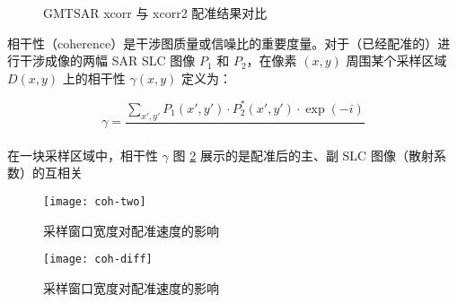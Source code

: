 \begin{figure}[htbp]
\centering
{}
\caption{GMTSAR xcorr 与 xcorr2 配准结果对比} \label{fig:exp_result}
\end{figure}

相干性（coherence）是干涉图质量或信噪比的重要度量。对于（已经配准的）进行干涉成像的两幅 SAR SLC 图像 $P_1$ 和 $P_2$，在像素 $(x, y)$ 周围某个采样区域 $D(x, y)$ 上的相干性 $\gamma(x, y)$ 定义为：

\begin{equation}
    \gamma = \frac{\sum_{x', y'} P_1(x', y') \cdot P_2^*(x', y') \cdot \exp(-i)}{}
\end{equation}


在一块采样区域中，相干性 $\gamma$
图 \ref{fig:coh-two} 展示的是配准后的主、副 SLC 图像（散射系数）的互相关

\begin{figure}[htbp]
\centering
\texttt{[image: coh-two]}
\caption{采样窗口宽度对配准速度的影响} \label{fig:coh-two}
\end{figure}


\begin{figure}[htbp]
\centering
\texttt{[image: coh-diff]}
\caption{采样窗口宽度对配准速度的影响} \label{fig:coh-diff}
\end{figure}
